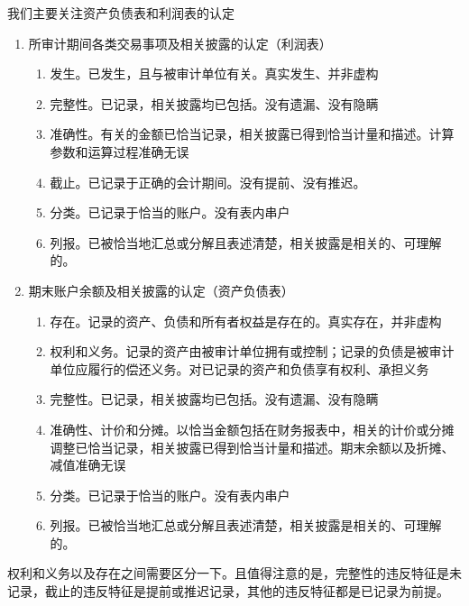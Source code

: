 \documentclass[UTF8,12pt]{ctexart}
\numberwithin{equation}{section} %
\numberwithin{figure}{section}
\numberwithin{table}{section}
\begin{document}
	我们主要关注资产负债表和利润表的认定
	\begin{enumerate}
		\item 所审计期间各类交易事项及相关披露的认定（利润表）
		\begin{enumerate}
			\item 发生。已发生，且与被审计单位有关。真实发生、并非虚构
			
			\item 完整性。已记录，相关披露均已包括。没有遗漏、没有隐瞒
			
			\item 准确性。有关的金额已恰当记录，相关披露已得到恰当计量和描述。计算参数和运算过程准确无误
			
			\item 截止。已记录于正确的会计期间。没有提前、没有推迟。
			
			\item 分类。已记录于恰当的账户。没有表内串户
			
			\item 列报。已被恰当地汇总或分解且表述清楚，相关披露是相关的、可理解的。
		\end{enumerate}
		
		\item 期末账户余额及相关披露的认定（资产负债表）
		\begin{enumerate}
			\item 存在。记录的资产、负债和所有者权益是存在的。真实存在，并非虚构
			
			\item 权利和义务。记录的资产由被审计单位拥有或控制；记录的负债是被审计单位应履行的偿还义务。对已记录的资产和负债享有权利、承担义务
			
			\item 完整性。已记录，相关披露均已包括。没有遗漏、没有隐瞒
			
			\item 准确性、计价和分摊。以恰当金额包括在财务报表中，相关的计价或分摊调整已恰当记录，相关披露已得到恰当计量和描述。期末余额以及折摊、减值准确无误
			
			\item 分类。已记录于恰当的账户。没有表内串户
			
			\item 列报。已被恰当地汇总或分解且表述清楚，相关披露是相关的、可理解的。
		\end{enumerate}
	\end{enumerate}
	
	权利和义务以及存在之间需要区分一下。且值得注意的是，完整性的违反特征是未记录，截止的违反特征是提前或推迟记录，其他的违反特征都是已记录为前提。
	
\end{document}
